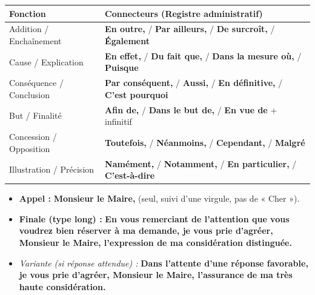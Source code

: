 \documentclass[11pt]{article}
\begin{document}
\begin{aretenir}
\begin{center}
\begin{tabular}{|l|l|}\hline
\rowcolor{popblueL} \textbf{Fonction} & \textbf{Connecteurs (Registre administratif)} \\ \hline
Addition / Enchaînement & \textbf{En outre,} / \textbf{Par ailleurs,} / \textbf{De surcroît,} / \textbf{Également} \\ \hline
Cause / Explication & \textbf{En effet,} / \textbf{Du fait que,} / \textbf{Dans la mesure où,} / \textbf{Puisque} \\ \hline
Conséquence / Conclusion & \textbf{Par conséquent,} / \textbf{Aussi,} / \textbf{En définitive,} / \textbf{C'est pourquoi} \\ \hline
But / Finalité & \textbf{Afin de,} / \textbf{Dans le but de,} / \textbf{En vue de} + infinitif \\ \hline
Concession / Opposition & \textbf{Toutefois,} / \textbf{Néanmoins,} / \textbf{Cependant,} / \textbf{Malgré} \\ \hline
Illustration / Précision & \textbf{Namément,} / \textbf{Notamment,} / \textbf{En particulier,} / \textbf{C'est-à-dire} \\ \hline
\end{tabular}
\end{center}
\end{aretenir}

\begin{aretenir}
\begin{itemize}
    \item \textbf{Appel :} \textbf{Monsieur le Maire,} (seul, suivi d'une virgule, pas de « Cher »).
    \item \textbf{Finale (type long) :} \textbf{En vous remerciant de l'attention que vous voudrez bien réserver à ma demande, je vous prie d'agréer, Monsieur le Maire, l'expression de ma considération distinguée.}
    \item \textit{Variante (si réponse attendue) :} \textbf{Dans l'attente d'une réponse favorable, je vous prie d'agréer, Monsieur le Maire, l'assurance de ma très haute considération.}
\end{itemize}
\end{aretenir}
\end{document}
